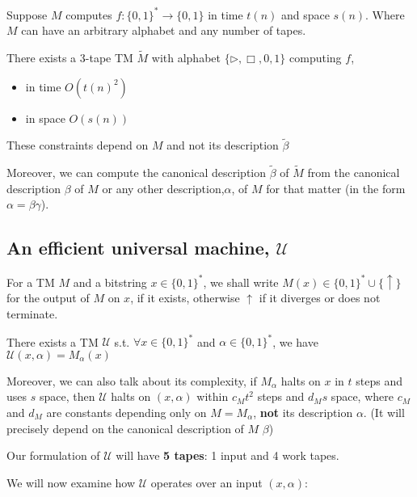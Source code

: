 \documentclass{article}
\begin{document}
\begin{theorem}\label{theorem:U}
  Suppose $M$ computes $f : \{ 0,1 \}^* \rightarrow \{ 0,1 \}$ in time $t(n)$ and space $s(n)$. Where $M$ can have an arbitrary alphabet and any number of tapes.

  There exists a 3-tape TM $\tilde{M}$ with alphabet $\{ \rhd, \Box, 0,1 \} $ computing $f$,
  \begin{itemize}
    \item in time $O(t(n)^{2})$
    \item in space $O(s(n))$
  \end{itemize}

  These constraints depend on $M$ and not its description \(\tilde{\beta}\)

  Moreover, we can compute the canonical description \(\tilde{\beta}\) of $\tilde{M}$ from the canonical description \(\beta\) of $M$ or any other description,\(\alpha\), of $M$ for that matter (in the form \(\alpha=\beta\gamma\)).
\end{theorem}

\subsection{An efficient universal machine, $\mathcal{U}$}
\label{subsec:uni-M}

For a TM $M$ and a bitstring $x \in \{ 0,1 \}^*$, we shall write $M(x) \in \{ 0,1 \}^* \cup \{ \uparrow \} $ for the output of $M$ on $x$, if it exists, otherwise $\uparrow$ if it diverges or does not terminate.

\begin{theorem}
  There exists a TM $\mathcal{U}$ s.t. $\forall x \in \{ 0,1 \}^*$ and $\alpha \in \{ 0,1 \}^*$, we have $\mathcal{U}(x,\alpha) = M_{\alpha}(x)$

  Moreover, we can also talk about its complexity, if $M_{\alpha}$ halts on $x$ in $t$ steps and uses $s$ space, then $\mathcal{U}$ halts on $(x,\alpha)$ within $c_{M}t^{2}$ steps and $d_{M}s$ space, where $c_{M}$ and $d_{M}$ are constants depending only on $M = M_{\alpha}$, \textbf{not} its description \(\alpha\). (It will precisely depend on the canonical description of $M$ \(\beta\))

  Our formulation of $\mathcal{U}$ will have \textbf{5 tapes}: 1 input and 4 work tapes.
\end{theorem}

We will now examine how $\mathcal{U}$ operates over an input $(x,\alpha)$:
\end{document}
